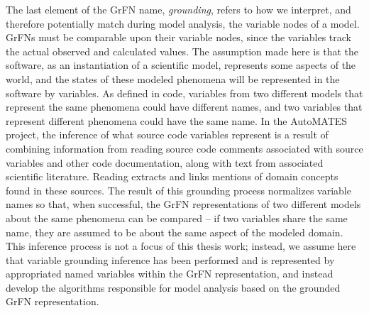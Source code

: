 The last element of the GrFN name, \emph{grounding}, refers to how we interpret, and therefore potentially match during model analysis, the variable nodes of a model.
GrFNs must be comparable upon their variable nodes, since the variables track the actual observed and calculated values.
The assumption made here is that the software, as an instantiation of a scientific model, represents some aspects of the world, and the states of these modeled phenomena will be represented in the software by variables.
As defined in code, variables from two different models that represent the same phenomena could have different names, and two variables that represent different phenomena could have the same name.
In the AutoMATES project, the inference of what source code variables represent is a result of combining information from reading source code comments associated with source variables and other code documentation, along with text from associated scientific literature. Reading extracts and links mentions of domain concepts found in these sources. The result of this grounding process normalizes variable names so that, when successful, the GrFN representations of two different models about the same phenomena can be compared -- if two variables share the same name, they are assumed to be about the same aspect of the modeled domain. This inference process is not a focus of this thesis work; instead, we assume here that variable grounding inference has been performed and is represented by appropriated named variables within the GrFN representation, and instead develop the algorithms responsible for model analysis based on the grounded GrFN representation.


